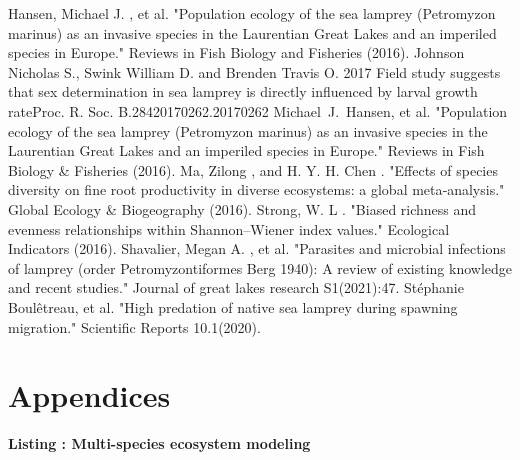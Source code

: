 \documentclass[12pt]{article}  %
\begin{document}
\clearpage   %
\begin{thebibliography}{99}
	 Hansen, Michael J. , et al. "Population ecology of the sea lamprey (Petromyzon marinus) as an invasive species in the Laurentian Great Lakes and an imperiled species in Europe." Reviews in Fish Biology and Fisheries (2016).
	 Johnson Nicholas S., Swink William D. and Brenden Travis O. 2017 Field study suggests that sex determination in sea lamprey is directly influenced by larval growth rateProc. R. Soc. B.28420170262.20170262
	 Michael J. Hansen, et al. "Population ecology of the sea lamprey (Petromyzon marinus) as an invasive species in the Laurentian Great Lakes and an imperiled species in Europe." Reviews in Fish Biology \& Fisheries (2016).
	 Ma, Zilong , and  H. Y. H. Chen . "Effects of species diversity on fine root productivity in diverse ecosystems: a global meta‐analysis." Global Ecology \& Biogeography (2016).
	 Strong, W. L . "Biased richness and evenness relationships within Shannon–Wiener index values." Ecological Indicators (2016).
	 Shavalier, Megan A. , et al. "Parasites and microbial infections of lamprey (order Petromyzontiformes Berg 1940): A review of existing knowledge and recent studies." Journal of great lakes research S1(2021):47.
	 Stéphanie Boulêtreau, et al. "High predation of native sea lamprey during spawning migration." Scientific Reports 10.1(2020).
\end{thebibliography}
%  
\clearpage
\section*{Appendices}
\begin{center}
\textbf{Listing : Multi-species ecosystem modeling}\par
\end{center}
\end{document}
